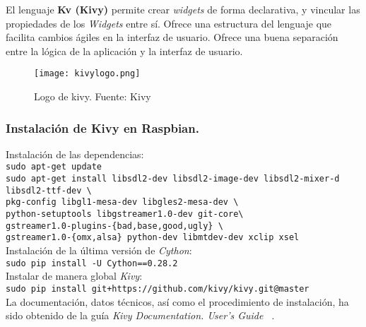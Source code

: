 El lenguaje \textbf{Kv (Kivy)} permite crear \emph{widgets} de forma declarativa, y vincular las propiedades de los \emph{Widgets} entre sí. Ofrece una estructura del lenguaje que facilita cambios ágiles en la interfaz de usuario. Ofrece una buena separación entre la lógica de la aplicación y la interfaz de usuario.\\
\begin{figure}[!h]
\begin{center}
\texttt{[image: kivylogo.png]}
\caption{Logo de kivy. Fuente: Kivy ~\cite{Kivy}}
\label{fig:kivylogo}
\end{center}
\end{figure}

\subsubsection{Instalación de Kivy en Raspbian.}

Instalación de las dependencias:\\
\colorbox[gray]{0.85}{\texttt{sudo apt-get update}}\\
\colorbox[gray]{0.85}{\texttt{sudo apt-get install libsdl2-dev libsdl2-image-dev libsdl2-mixer-d libsdl2-ttf-dev \textbackslash}}\\
\colorbox[gray]{0.85}{\hspace{0.8cm} \texttt{pkg-config libgl1-mesa-dev libgles2-mesa-dev \textbackslash}}\\ 
\colorbox[gray]{0.85}{\hspace{0.8cm} \texttt{python-setuptools  libgstreamer1.0-dev git-core\textbackslash}}\\ 
\colorbox[gray]{0.85}{\hspace{0.8cm} \texttt{gstreamer1.0-plugins-\{bad,base,good,ugly\} \textbackslash}}\\
\colorbox[gray]{0.85}{\hspace{0.8cm} \texttt{gstreamer1.0-\{omx,alsa\} python-dev libmtdev-dev xclip xsel}}\\
Instalación de la última versión de \emph{Cython}:\\
\colorbox[gray]{0.85}{\texttt{sudo pip install -U Cython==0.28.2}}\\
Instalar de manera global \emph{Kivy}:\\
\colorbox[gray]{0.85}{\texttt{sudo pip install git+https://github.com/kivy/kivy.git@master
}}\\

La documentación, datos técnicos, así como el procedimiento de instalación, ha sido obtenido de la guía \emph{Kivy Documentation. User's Guide ~\cite{Kivy}}.  

